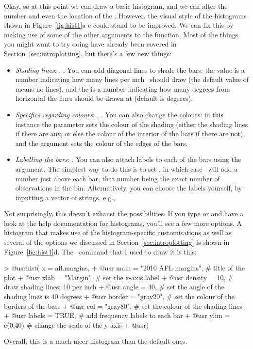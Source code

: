 Okay, so at this point we can draw a basic histogram, and we can alter the number and even the location of the . However, the visual style of the histograms shown in Figure~\ref{fig:hist1}a-c could stand to be improved. We can fix this by making use of some of the other arguments to the  function. Most of the things you might want to try doing have already been covered in Section~\ref{sec:introplotting}, but there's a few new things: 
\begin{itemize}
\item {\it Shading lines}: , . You can add diagonal lines to shade the bars: the  value is a number indicating how many lines per inch \R\ should draw (the default value of  means no lines), and the  is a number indicating how many degrees from horizontal the lines should be drawn at (default is  degrees). 
\item {\it Specifics regarding colours}: , . You can also change the colours: in this instance the  parameter sets the colour of the shading (either the shading lines if there are any, or else the colour of the interior of the bars if there are not), and the  argument sets the colour of the edges of the bars. 
\item {\it Labelling the bars}: .  You can also attach labels to each of the bars using the  argument. The simplest way to do this is to set , in which case \R\ will add a number just above each bar, that number being the exact number of observations in the bin. Alternatively, you can choose the labels yourself, by inputting a vector of strings, e.g., 
\end{itemize}
Not surprisingly, this doesn't exhaust the possibilities. If you type  or  and have a look at the help documentation for histograms, you'll see a few more options. A histogram that makes use of the histogram-specific customisations as well as several of the options we discussed in Section~\ref{sec:introplotting} is shown in Figure~\ref{fig:hist1}d. The \R\ command that I used to draw it is this:
\begin{rblock1}
> @usr{hist( x = afl.margins, }
+ @usr{      main = "2010 AFL margins",} # title of the plot
+ @usr{      xlab = "Margin", }          # set the x-axis label
+ @usr{      density = 10,    }          # draw shading lines: 10 per inch
+ @usr{      angle = 40,       }         # set the angle of the shading lines is 40 degrees
+ @usr{      border = "gray20", }        # set the colour of the borders of the bars
+ @usr{      col = "gray80",    }        # set the colour of the shading lines
+ @usr{      labels = TRUE,}             # add frequency labels to each bar
+ @usr{      ylim = c(0,40)}             # change the scale of the y-axis
+ @usr{)}
\end{rblock1}
Overall, this is a much nicer histogram than the default ones.


